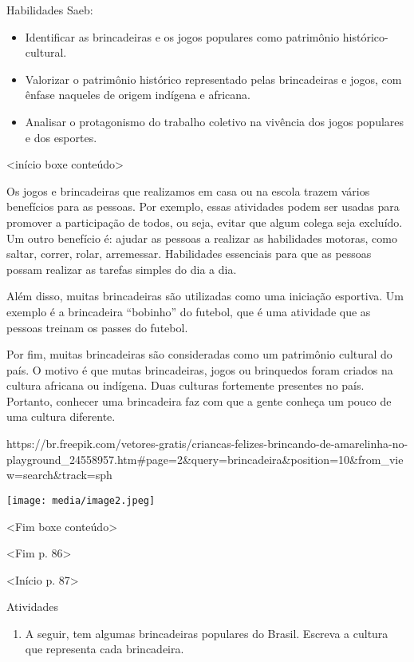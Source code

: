 Habilidades Saeb:

\begin{itemize}
\item
  Identificar as brincadeiras e os jogos populares como patrimônio
  histórico-cultural.
\item
  Valorizar o patrimônio histórico representado pelas brincadeiras e
  jogos, com ênfase naqueles de origem indígena e africana.
\item
  Analisar o protagonismo do trabalho coletivo na vivência dos jogos
  populares e dos esportes.
\end{itemize}

\textless{}início boxe conteúdo\textgreater{}

Os jogos e brincadeiras que realizamos em casa ou na escola trazem
vários benefícios para as pessoas. Por exemplo, essas atividades podem
ser usadas para promover a participação de todos, ou seja, evitar que
algum colega seja excluído. Um outro benefício é: ajudar as pessoas a
realizar as habilidades motoras, como saltar, correr, rolar, arremessar.
Habilidades essenciais para que as pessoas possam realizar as tarefas
simples do dia a dia.

Além disso, muitas brincadeiras são utilizadas como uma iniciação
esportiva. Um exemplo é a brincadeira ``bobinho'' do futebol, que é uma
atividade que as pessoas treinam os passes do futebol.

Por fim, muitas brincadeiras são consideradas como um patrimônio
cultural do país. O motivo é que mutas brincadeiras, jogos ou brinquedos
foram criados na cultura africana ou indígena. Duas culturas fortemente
presentes no país. Portanto, conhecer uma brincadeira faz com que a
gente conheça um pouco de uma cultura diferente.

https://br.freepik.com/vetores-gratis/criancas-felizes-brincando-de-amarelinha-no-playground\_24558957.htm\#page=2\&query=brincadeira\&position=10\&from\_view=search\&track=sph

\texttt{[image: media/image2.jpeg]}

\textless{}Fim boxe conteúdo\textgreater{}

\textless{}Fim p. 86\textgreater{}

\textless{}Início p. 87\textgreater{}

Atividades

\begin{enumerate}
\def\labelenumi{\arabic{enumi}.}
\item
  A seguir, tem algumas brincadeiras populares do Brasil. Escreva a
  cultura que representa cada brincadeira.
\end{enumerate}

